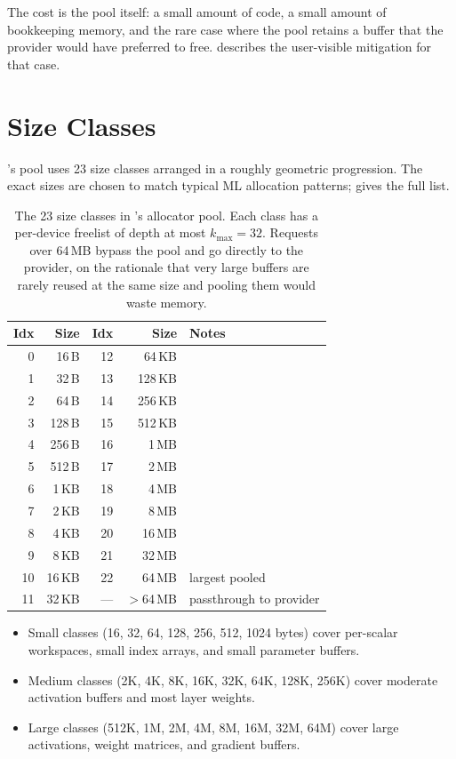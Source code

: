 The cost is the pool itself: a small amount of code, a small amount
of bookkeeping memory, and the rare case where the pool retains a
buffer that the provider would have preferred to free.
 describes the user-visible
mitigation for that case.

\section{Size Classes}
\label{sec:allocator:size_classes}

\Lucid's pool uses 23 size classes arranged in a roughly geometric
progression. The exact sizes are chosen to match typical ML
allocation patterns;  gives the
full list.

\begin{table}[t]
\centering
\small
\begin{tabular}{rrrrl}
\toprule
Idx & Size & Idx & Size & Notes \\
\midrule
 0 & 16\,B    & 12 & 64\,KB   & \\
 1 & 32\,B    & 13 & 128\,KB  & \\
 2 & 64\,B    & 14 & 256\,KB  & \\
 3 & 128\,B   & 15 & 512\,KB  & \\
 4 & 256\,B   & 16 & 1\,MB    & \\
 5 & 512\,B   & 17 & 2\,MB    & \\
 6 & 1\,KB    & 18 & 4\,MB    & \\
 7 & 2\,KB    & 19 & 8\,MB    & \\
 8 & 4\,KB    & 20 & 16\,MB   & \\
 9 & 8\,KB    & 21 & 32\,MB   & \\
10 & 16\,KB   & 22 & 64\,MB   & largest pooled \\
11 & 32\,KB   & ---  & $>$64\,MB & passthrough to provider \\
\bottomrule
\end{tabular}
\caption[Allocator size classes.]{The 23 size classes in \Lucid's
allocator pool. Each class has a per-device freelist of depth at
most \(k_{\max} = 32\). Requests over 64\,MB bypass the pool and
go directly to the provider, on the rationale that very large
buffers are rarely reused at the same size and pooling them would
waste memory.}
\label{tab:allocator:size_classes}
\end{table}

\begin{itemize}
  \item Small classes (16, 32, 64, 128, 256, 512, 1024 bytes) cover
    per-scalar workspaces, small index arrays, and small parameter
    buffers.
  \item Medium classes (2K, 4K, 8K, 16K, 32K, 64K, 128K, 256K) cover
    moderate activation buffers and most layer weights.
  \item Large classes (512K, 1M, 2M, 4M, 8M, 16M, 32M, 64M) cover
    large activations, weight matrices, and gradient buffers.
\end{itemize}

